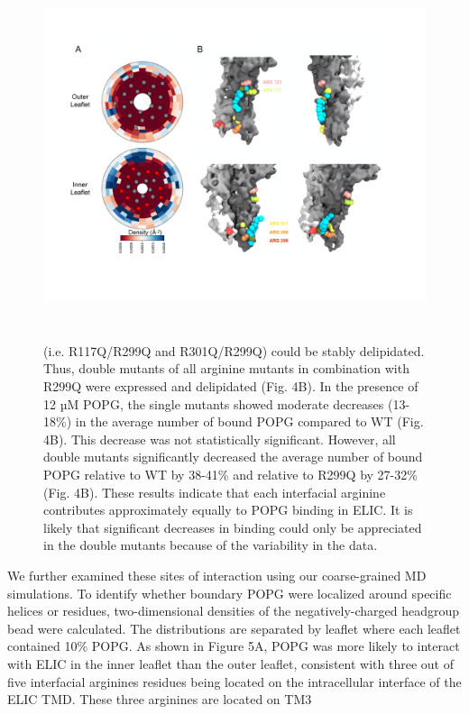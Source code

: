 \begin{figure}
\includegraphics[width=6.37500in,height=4.25278in]{./pandoc_test/media/image6.pdf}\caption{(i.e.
R117Q/R299Q and R301Q/R299Q) could be stably delipidated. Thus, double
mutants of all arginine mutants in combination with R299Q were expressed
and delipidated (Fig. 4B). In the presence of 12 µM POPG, the single
mutants showed moderate decreases (13-18\%) in the average number of
bound POPG compared to WT (Fig. 4B). This decrease was not statistically
significant. However, all double mutants significantly decreased the
average number of bound POPG relative to WT by 38-41\% and relative to
R299Q by 27-32\% (Fig. 4B). These results indicate that each interfacial
arginine contributes approximately equally to POPG binding in ELIC. It
is likely that significant decreases in binding could only be
appreciated in the double mutants because of the variability in the
data.}
\end{figure}
We further examined these sites of interaction using our coarse-grained
MD simulations. To identify whether boundary POPG were localized around
specific helices or residues, two-dimensional densities of the
negatively-charged headgroup bead were calculated. The distributions are
separated by leaflet where each leaflet contained 10\% POPG. As shown in
Figure 5A, POPG was more likely to interact with ELIC in the inner
leaflet than the outer leaflet, consistent with three out of five
interfacial arginines residues being located on the intracellular
interface of the ELIC TMD. These three arginines are located on TM3
